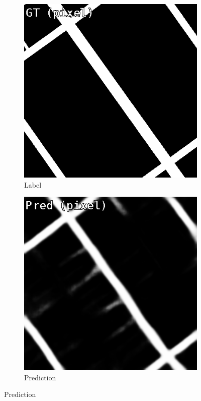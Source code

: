 \documentclass[10pt,conference,compsocconf]{IEEEtran}
\begin{document}
\begin{figure}[h]
\begin{subfigure}[t]{.25\linewidth}
  \includegraphics[width=.9\linewidth]{pictures/eval_label.png}
  \caption{\footnotesize Label}
  \label{fig:patch_diff_label}
\end{subfigure}%
\begin{subfigure}[t]{.25\linewidth}
  \centering
  \includegraphics[width=.9\linewidth]{pictures/eval_pred.png}
  \caption{\footnotesize Prediction}
  \label{fig:patch_diff_pred}

\end{subfigure}
\end{figure}
\end{document}
